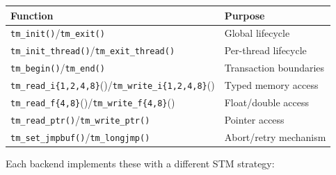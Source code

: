 \documentclass[article,12pt]{article}
\begin{document}
\begin{center}
\begin{tabular}{ll}
\toprule
Function & Purpose \\
\midrule
\texttt{tm\_init()}/\texttt{tm\_exit()} & Global lifecycle \\
\texttt{tm\_init\_thread()}/\texttt{tm\_exit\_thread()} & Per-thread lifecycle \\
\texttt{tm\_begin()}/\texttt{tm\_end()} & Transaction boundaries \\
\texttt{tm\_read\_i\{1,2,4,8\}}()/\texttt{tm\_write\_i\{1,2,4,8\}}() & Typed memory access \\
\texttt{tm\_read\_f\{4,8\}}()/\texttt{tm\_write\_f\{4,8\}}() & Float/double access \\
\texttt{tm\_read\_ptr()}/\texttt{tm\_write\_ptr()} & Pointer access \\
\texttt{tm\_set\_jmpbuf()}/\texttt{tm\_longjmp()} & Abort/retry mechanism \\
\bottomrule
\end{tabular}
\end{center}

Each backend implements these with a different STM strategy:
\end{document}
